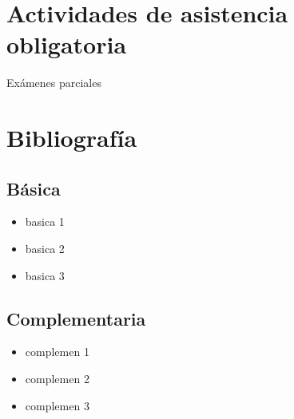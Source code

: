 \documentclass[11pt]{article}
\begin{document}
\section*{Actividades de asistencia obligatoria}

Exámenes parciales

\section*{Bibliografía}

\subsection*{Básica}

\begin{itemize}
\item basica 1  \item  basica 2  \item  basica 3  
\end{itemize}

\subsection*{Complementaria}

\begin{itemize}
\item complemen 1  \item  complemen 2  \item  complemen 3  
\end{itemize}
\end{document}
